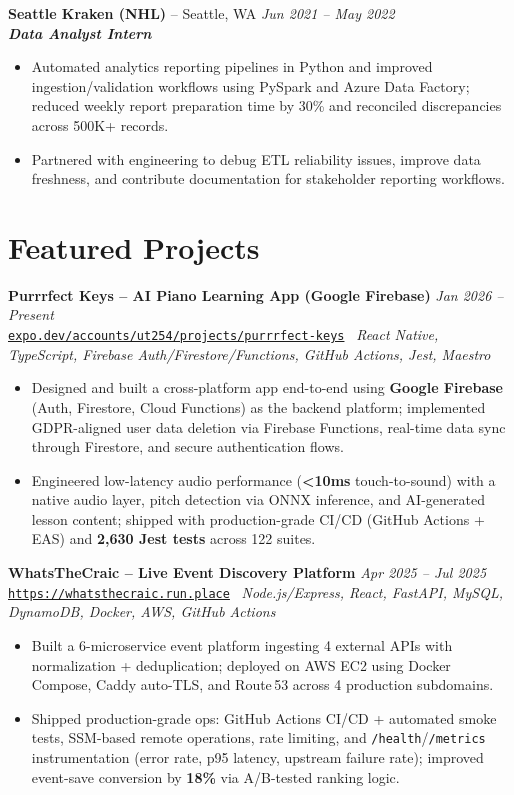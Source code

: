 \documentclass[10pt,a4paper]{article}
\newcommand{\jobentry}[4]{%
  \Needspace{3\baselineskip}%
  \textbf{#1} -- #2 \hfill \textit{#3}\\[-0.15em]
  \textit{#4}\\[-0.25em]
}
\newcommand{\projectentryurl}[5]{%
  \Needspace{3\baselineskip}%
  \textbf{#1} \hfill \textit{#2}\\[-0.15em]
  {\small\href{#3}{\texttt{#4}}} \textbar\ \textit{#5}\\[-0.25em]
}
\begin{document}
\jobentry{Seattle Kraken (NHL)}{Seattle, WA}{Jun 2021 -- May 2022}{\textbf{\textit{Data Analyst Intern}}}
\begin{itemize}
  \item Automated analytics reporting pipelines in Python and improved ingestion/validation workflows using PySpark and Azure Data Factory; reduced weekly report preparation time by 30\% and reconciled discrepancies across 500K+ records.
  \item Partnered with engineering to debug ETL reliability issues, improve data freshness, and contribute documentation for stakeholder reporting workflows.
\end{itemize}

\section*{Featured Projects}
\projectentryurl{Purrrfect Keys -- AI Piano Learning App (Google Firebase)}{Jan 2026 -- Present}{https://expo.dev/accounts/ut254/projects/purrrfect-keys/builds/229bd252-c684-4af5-b39f-4f3623455a7e}{expo.dev/accounts/ut254/projects/purrrfect-keys}{React Native, TypeScript, Firebase Auth/Firestore/Functions, GitHub Actions, Jest, Maestro}
\begin{itemize}
  \item Designed and built a cross-platform app end-to-end using \textbf{Google Firebase} (Auth, Firestore, Cloud Functions) as the backend platform; implemented GDPR-aligned user data deletion via Firebase Functions, real-time data sync through Firestore, and secure authentication flows.
  \item Engineered low-latency audio performance (\textbf{\textless10ms} touch-to-sound) with a native audio layer, pitch detection via ONNX inference, and AI-generated lesson content; shipped with production-grade CI/CD (GitHub Actions + EAS) and \textbf{2,630 Jest tests} across 122 suites.
\end{itemize}

\vspace{0.10em}
\projectentryurl{WhatsTheCraic -- Live Event Discovery Platform}{Apr 2025 -- Jul 2025}{https://github.com/UT07/whatsthecraic}{https://whatsthecraic.run.place}{Node.js/Express, React, FastAPI, MySQL, DynamoDB, Docker, AWS, GitHub Actions}
\begin{itemize}
  \item Built a 6-microservice event platform ingesting 4 external APIs with normalization + deduplication; deployed on AWS EC2 using Docker Compose, Caddy auto-TLS, and Route\,53 across 4 production subdomains.
  \item Shipped production-grade ops: GitHub Actions CI/CD + automated smoke tests, SSM-based remote operations, rate limiting, and \texttt{/health}/\texttt{/metrics} instrumentation (error rate, p95 latency, upstream failure rate); improved event-save conversion by \textbf{18\%} via A/B-tested ranking logic.
\end{itemize}
\end{document}
